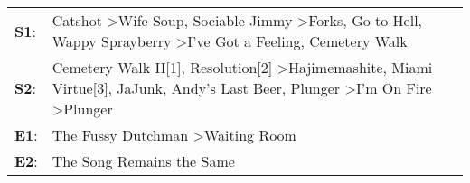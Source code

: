 \begin{supertabular}{p{0.03\textwidth}p{0.92\textwidth}}
 \textbf{S1}:  &                                              Catshot\textsuperscript{} \textgreater \enspace Wife Soup\textsuperscript{}, \enspace Sociable Jimmy\textsuperscript{} \textgreater \enspace Forks\textsuperscript{}, \enspace Go to Hell\textsuperscript{}, \enspace Wappy Sprayberry\textsuperscript{} \textgreater \enspace I've Got a Feeling\textsuperscript{}, \enspace Cemetery Walk\textsuperscript{}  \enspace  \\
 \textbf{S2}:  &  Cemetery Walk II[1]\textsuperscript{}, \enspace Resolution[2]\textsuperscript{} \textgreater \enspace Hajimemashite\textsuperscript{}, \enspace Miami Virtue[3]\textsuperscript{}, \enspace JaJunk\textsuperscript{}, \enspace Andy's Last Beer\textsuperscript{}, \enspace Plunger\textsuperscript{} \textgreater \enspace I'm On Fire\textsuperscript{} \textgreater \enspace Plunger\textsuperscript{}  \enspace  \\
 \textbf{E1}:  &                                                                                                                                                                                                                                                                                                                  The Fussy Dutchman\textsuperscript{} \textgreater \enspace Waiting Room\textsuperscript{}  \enspace  \\
 \textbf{E2}:  &                                                                                                                                                                                                                                                                                                                                                                The Song Remains the Same\textsuperscript{}  \enspace  \\
\end{supertabular}

